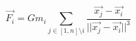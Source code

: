 \documentclass{article}
\begin{document}
\begin{equation*}
\vec{F_i} = G m_i \sum_{j \in [1, n]\setminus i}\frac{\vec{x_j} - \vec{x_i}}{||\vec{x_j} - \vec{x_i}||^3}
\end{equation*}
\end{document}
